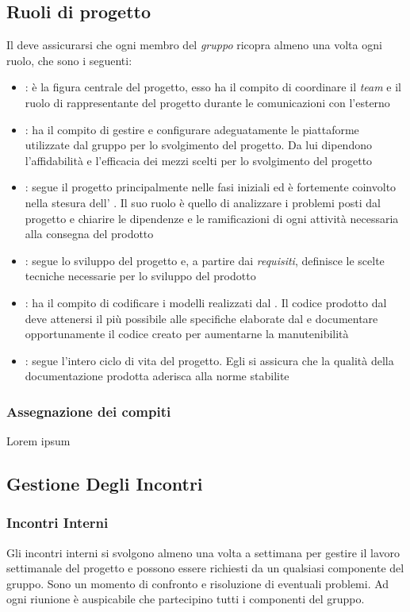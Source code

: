 
\subsection{Ruoli di progetto}
Il \RdP{} deve assicurarsi che ogni membro del \emph{gruppo} ricopra almeno una volta ogni ruolo, che sono i seguenti:
	\begin{itemize}
		\item \textbf{\RdP}: è la figura centrale del progetto, esso ha il compito di coordinare il \emph{team} e il ruolo di rappresentante del progetto durante le comunicazioni con l'esterno
		\item \textbf{\Amm}: ha il compito di gestire e configurare adeguatamente le piattaforme utilizzate dal gruppo per lo svolgimento del progetto. Da lui dipendono l'affidabilità e l'efficacia dei mezzi scelti per lo svolgimento del progetto
		\item \textbf{\Ana}: segue il progetto principalmente nelle fasi iniziali ed è fortemente coinvolto nella stesura dell' \AdR{}. Il suo ruolo è quello di analizzare i problemi posti dal progetto e chiarire le dipendenze e le ramificazioni di ogni attività necessaria alla consegna del prodotto
		\item \textbf{\Prog}: segue lo sviluppo del progetto e, a partire dai \emph{requisiti}, definisce le scelte tecniche necessarie per lo sviluppo del prodotto
		\item \textbf{\Progm}: ha il compito di codificare i modelli realizzati dal \Prog{}. Il codice prodotto dal \Progm{} deve attenersi il più possibile alle specifiche elaborate dal \Prog{} e documentare opportunamente il codice creato per aumentarne la manutenibilità
		\item \textbf{\Ver}: segue l'intero ciclo di vita del progetto. Egli si assicura che la qualità della documentazione prodotta aderisca alla norme stabilite
	\end{itemize}

	\subsubsection{Assegnazione dei compiti}
	Lorem ipsum %

\subsection{Gestione Degli Incontri}
	\subsubsection{Incontri Interni}
	Gli incontri interni si svolgono almeno una volta a settimana per gestire il lavoro settimanale del progetto e possono essere richiesti da un qualsiasi componente del gruppo. Sono un momento di confronto e risoluzione di eventuali problemi. Ad ogni riunione è auspicabile che partecipino tutti i componenti del gruppo.
